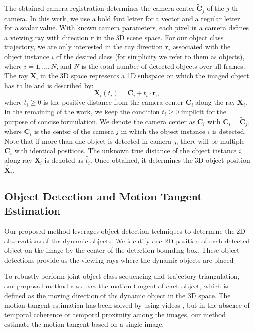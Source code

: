 The obtained camera registration determines the camera center $\mathbf{\tilde{C}}_j$ of the $j$-th camera. In this work, we use a bold font letter for a vector and a regular letter for a scalar value. 
With known camera parameters, each pixel in a camera defines a viewing ray with direction $\mathbf{r}$ in the 3D scene space. For our object class trajectory, we are only interested in the ray direction $\mathbf r_i$ associated with the object instance $i$ of the desired class (for simplicity we refer to them as objects), where  $i =1, \dots, N$, and $N$ is the total number of detected objects over all frames. %
The ray $\mathbf{X}_i$ in the 3D space represents a 1D subspace on which the imaged object has to lie and is described by:
\begin{equation}
\label{eq:ray}
\mathbf{X}_i(t_i)=\mathbf{C}_i + t_i \cdot \mathbf{r_i},
\end{equation}
where $t_i \geq 0$ is the positive distance from the camera center $\mathbf{C}_i$ along the ray $\mathbf{X}_i$.
In the remaining of the work, we keep the condition $t_i \geq 0$ implicit for the purpose of concise formulation.
We denote the camera center as $\mathbf{C}_i$  with $\mathbf{C}_i =\mathbf{\tilde{C}}_j$, where $\mathbf{C}_i$ is the center of the camera $j$ in which the object instance $i$ is detected. Note that if more than one object is detected in camera $j$, there will be multiple $\mathbf{C}_i$ with identical positions. The unknown true distance of the object instance $i$ along ray $\mathbf{X}_i$ is denoted as $\hat{t}_i$. Once obtained, it determines the 3D object position $\mathbf{\hat{X}}_i$. %


\subsection{Object Detection and Motion Tangent Estimation}
\label{sec:detection}

Our proposed method leverages object detection techniques to determine the 2D observations of the dynamic objects. We identify one 2D position of each detected object  on the image by the center of the detection bounding box. These object detections provide us the viewing rays where the dynamic objects are placed. 

To robustly perform joint object class sequencing and trajectory triangulation, our proposed method also uses the motion tangent of each object, which is defined as the moving direction of the dynamic object in the 3D space. 
The motion tangent estimation has been solved by using videos \cite{zhao2003face}, but  in the absence of temporal coherence or temporal proximity among the images, our method estimate the motion tangent based on a single image.

